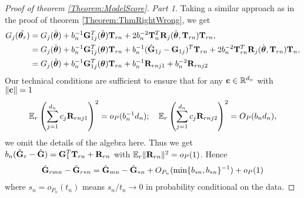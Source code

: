 \begin{proof}[Proof of theorem \ref{Theorem:ModelScore}]
\textit{Part 1.}
Taking a similar approach as in the proof of theorem \ref{Theorem:ThmRightWrong}, we get
%
\begin{align*}
G_{j}  (\hat{{\boldsymbol{\theta}}_r}  )
& = G_{j}  ( \hat{{\boldsymbol{\theta}}}  )
+ b_{n}^{-1} {\mathbf{G}}_{1 j}^{T}  ( \hat{{\boldsymbol{\theta}}}  ) {\mathbf{T}}_{r n} 
+ 2 b_{n}^{-2} {\mathbf{T}}_{ n}^{T} {\mathbf{R}}_{j}   ( \hat{{\boldsymbol{\theta}}}, {\mathbf{T}}_{r n}  ) {\mathbf{T}}_{r n}, \\
& = G_{j}  ( \hat{{\boldsymbol{\theta}}}  )
+ b_{n}^{-1} {\mathbf{G}}_{1 j}^{T}  ( {{\boldsymbol{\theta}}}  ) {\mathbf{T}}_{r n} 
+ b_{n}^{-1}  ( \hat{{\mathbf{G}}}_{1 j} - {\mathbf{G}}_{1 j}   )^{T} {\mathbf{T}}_{r n} 
+ 2 b_{n}^{-2} {\mathbf{T}}_{r n}^{T} {\mathbf{R}}_{j}   ( \hat{{\boldsymbol{\theta}}}, {\mathbf{T}}_{r n}  ) {\mathbf{T}}_{n}, \\
& = G_{j}  ( \hat{{\boldsymbol{\theta}}}  )
+ b_{n}^{-1} {\mathbf{G}}_{1 j}^{T}  ( {{\boldsymbol{\theta}}}  ) {\mathbf{T}}_{r n} 
+ b_{n}^{-1} {\mathbf{R}}_{r n j 1} + b_{n}^{-2} {\mathbf{R}}_{r n j 2}
\end{align*}
%
Our technical conditions are sufficient to ensure that for any ${\bf{c}} \in {\mathbb{R}}^{d_n}$ with 
$\| {\bf{c}} \| = 1$
\begin{align*} 
{\mathbb{E}}_r \left( \sum_{j =1}^{d_{n}} c_{j} {\mathbf{R}}_{r n j 1} \right)^{2} 
= o_P (b_{n}^{-1} d _{n}); \quad {\mathbb{E}}_r \left( \sum_{j =1}^{d_{n}} c_{j} {\mathbf{R}}_{r n j 2} \right)^{2} = O_P (b_{n} d_{n}), 
\end{align*}
we omit the details of the algebra here. Thus we get $b_{ n} (\hat {{\mathbf{G}}}_r - \hat {{\mathbf{G}}} ) = {\mathbf{G}}_1^T {\mathbf{T}}_{r n} + {\mathbf{R}}_{r n} $ with ${\mathbb{E}}_r \| {\mathbf{R}}_{r n} \|^2 = o_P(1)$. Hence
%
\begin{align}\label{eqn:ModelScoreProofEqn1}
\hat {{\mathbf{G}}}_{r m n} - \hat {{\mathbf{G}}}_{r * n} = \hat {{\mathbf{G}}}_{m n} - \hat {{\mathbf{G}}}_{* n} + O_{P_n} ( \min \{ b_{s n}, b_{* n} \}^{-1}) + o_P(1)
\end{align}
%
where $s_n = o_{P_n} (t_n)$ means $s_n / t_n \rightarrow 0$ in probability conditional on the data.


\end{proof}
